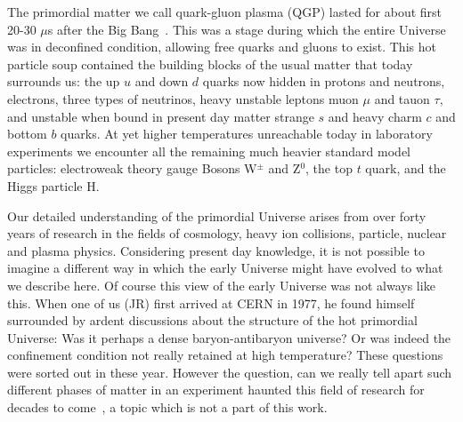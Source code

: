 The primordial matter we call quark-gluon plasma (QGP) lasted for about first 20-30 $\mu$s after the Big Bang~\cite{Letessier:2002ony}. This was a stage during which the entire Universe was in deconfined condition, allowing free quarks and gluons to exist. This hot particle soup contained the building blocks of the usual matter that today surrounds us: the up $u$ and down $d$ quarks now hidden in protons and neutrons, electrons, three types of neutrinos, heavy unstable leptons muon $\mu$ and tauon $\tau$, and unstable when bound in present day matter strange $s$ and heavy charm $c$ and bottom $b$ quarks. At yet higher temperatures unreachable today in laboratory experiments we encounter all the remaining much heavier standard model particles: electroweak theory gauge Bosons W$^\pm$ and Z$^0$, the top $t$ quark, and the Higgs particle H.

Our detailed understanding of the primordial Universe arises from over forty years of research in the fields of cosmology, heavy ion collisions, particle, nuclear and plasma physics. Considering present day knowledge, it is not possible to imagine a different way in which the early Universe might have evolved to what we describe here. Of course this view of the early Universe was not always like this.  When one of us (JR) first arrived at CERN in 1977, he found himself surrounded by ardent discussions about the structure of the hot primordial Universe: Was it perhaps a dense baryon-antibaryon universe? Or was indeed the confinement condition not really retained at high temperature? These questions were sorted out in these year. However the question, can we really tell  apart such different phases of matter in an experiment haunted this field of research for  decades to come~\cite{Rafelski:2015cxa}, a topic which is not a part of this work.

